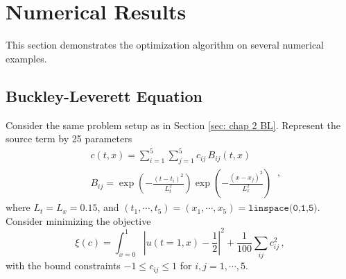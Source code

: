 \section{Numerical Results}
\label{sec: chap3 numerical}
This section demonstrates the optimization algorithm on several numerical examples.

\subsection{Buckley-Leverett Equation}
Consider the same problem setup as in Section \ref{sec: chap 2 BL}. 
Represent the source term by 25 parameters
\begin{equation}\begin{split}
    &c(t,x) = \sum_{i=1}^5 \sum_{j=1}^5 c_{ij} \, B_{ij}(t,x)\\
    &B_{ij} = \exp\left(-\frac{(t-t_i)^2}{L_t^2}\right)
    \exp\left(-\frac{(x-x_j)^2}{L_x^2}\right)
\end{split} \,, \end{equation}
where $L_t=L_x=0.15$, and $(t_1, \cdots, t_5) =
(x_1, \cdots, x_5) =\texttt{linspace(0,1,5)}$.
Consider minimizing the objective
\begin{equation}
    \xi(c) = \int_{x=0}^1 \left| u(t=1,x) -  \frac{1}{2}\right|^2 + \frac{1}{100}\sum_{ij} c_{ij}^2
    \,,
    \label{eqn: chap 3 BL obj fun}
\end{equation}
with the bound constraints $-1 \le c_{ij}\le 1$ for $i,j=1,\cdots, 5$.\\

